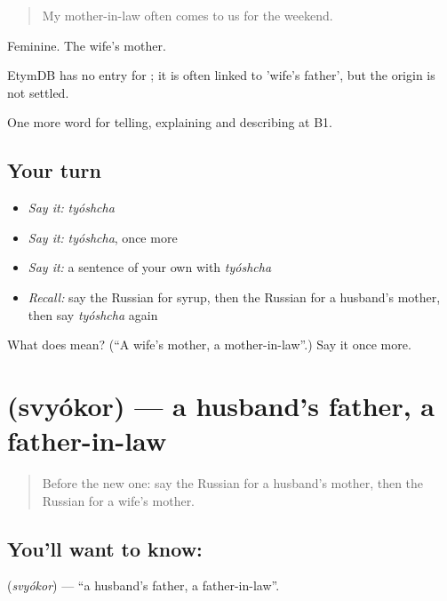 \begin{quote}
My mother-in-law often comes to us for the weekend.
\end{quote}

Feminine. The wife's mother.

\begin{cousinweb}
EtymDB has no entry for \emph{}; it is often linked to \emph{} 'wife's father', but the origin is not settled.
\end{cousinweb}

\begin{grammarlens}[title={What you've built}]
One more word for telling, explaining and describing at B1.
\end{grammarlens}

\subsection*{Your turn}
\begin{itemize}
\raggedright
  \item \emph{Say it:} \emph{tyóshcha}
  \item \emph{Say it:} \emph{tyóshcha}, once more
  \item \emph{Say it:} a sentence of your own with \emph{tyóshcha}
  \item \emph{Recall:} say the Russian for syrup, then the Russian for a husband's mother, then say \emph{tyóshcha} again
\end{itemize}

\begin{tcolorbox}[breakable,colback=teal!4,colframe=teal!35!black,title={Before you move on}]
What does  mean? (\textquotedblleft{}A wife's mother, a mother-in-law\textquotedblright{}.) Say it once more.
\end{tcolorbox}
\section[\texorpdfstring{\ru{свёкор} (svyókor)}{свёкор (svyókor)}]{ (svyókor) — a husband's father, a father-in-law}

\label{lesson:RU-C491-svyokor}



\begin{quote}
Before the new one: say the Russian for a husband's mother, then the Russian for a wife's mother.
\end{quote}

\subsection*{You'll want to know: }
\textbf{} (\emph{svyókor}) — \textquotedblleft{}a husband's father, a father-in-law\textquotedblright{}.

